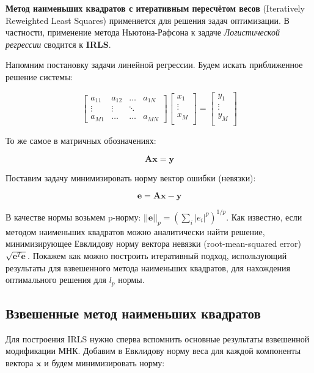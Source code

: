 {\textbf{Метод наименьших квадратов с итеративным пересчётом весов} (Iteratively Reweighted Least Squares) применяется для решения задач оптимизации. В частности, применение метода Ньютона-Рафсона к задаче \textit{Логистической регрессии} сводится к \textbf{IRLS}.

Напомним постановку задачи линейной регрессии. Будем искать приближенное решение системы:

\[ \begin{bmatrix}
        a_{11} & a_{12} & \dots  & a_{1N} \\
        \vdots & \vdots & \ddots &        \\
        a_{M1} & \dots  & \dots  & a_{MN}
    \end{bmatrix} \begin{bmatrix}
        x_{1}  \\
        \vdots \\
        x_{M}  \\
    \end{bmatrix}
    =
    \begin{bmatrix}
        y_{1}  \\
        \vdots \\
        y_{M}  \\
    \end{bmatrix} \]

То же самое в матричных обозначениях:

\[
    \boldsymbol{A} \boldsymbol{x} = \boldsymbol{y}
\]

Поставим задачу минимизировать норму вектор ошибки (невязки):

\[
    \boldsymbol{e} = \boldsymbol{A} \boldsymbol{x} - \boldsymbol{y}
\]

В качестве нормы возьмем p-норму: $||\boldsymbol{e}||_p = \left( \sum_i |e_i|^p \right)^{1/p}$. Как известно, если методом наименьших квадратов можно аналитически найти решение, минимизирующее Евклидову норму вектора невязки (root-mean-squared error) $\sqrt{\boldsymbol{e}^T \boldsymbol{e}}$. Покажем как можно построить итеративный подход, использующий результаты для взвешенного метода наименьших квадратов, для нахождения оптимального решения для $l_p$ нормы.

\subsection{Взвешенные метод наименьших квадратов}

Для построения IRLS нужно сперва вспомнить основные результаты взвешенной модификации МНК. Добавим в Евклидову норму веса для каждой компоненты вектора $\boldsymbol{x}$ и будем минимизировать норму:

}
